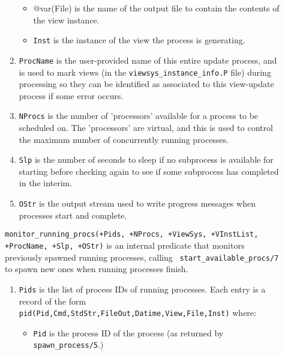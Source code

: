 \begin{description}
\begin{enumerate}
\begin{itemize}
\item @var(File) is the name of the output file to contain the
contents of the view instance.

\item {\tt Inst} is the instance of the view the process is generating.

\end{itemize}

\item {\tt ProcName} is the user-provided name of this entire update
process, and is used to mark views (in the
{\tt viewsys\_instance\_info.P} file) during processing so they can be
identified as associated to this view-update process if some error
occurs.

\item {\tt NProcs} is the number of 'processors' available for a
process to be scheduled on.  The 'processors' are virtual, and this is
used to control the maximum number of concurrently running processes.

\item {\tt Slp} is the number of seconds to sleep if no subprocess is
available for starting before checking again to see if some subprocess
has completed in the interim.

\item {\tt OStr} is the output stream used to write progress messages
when processes start and complete.

\end{enumerate}

%
{\tt monitor\_running\_procs(+Pids, +NProcs, +ViewSys, +VInstList,
  +ProcName, +Slp, +OStr)} is an internal predicate that monitors
previously spawned running processes, calling {\tt
  start\_available\_procs/7} to spawn new ones when running processes
finish.

\begin{enumerate}

\item {\tt Pids} is the list of process IDs of running processes.
Each entry is a record of the form
{\tt pid(Pid,Cmd,StdStr,FileOut,Datime,View,File,Inst)} where:

\begin{itemize}

\item {\tt Pid} is the process ID of the process (as returned by
{\tt spawn\_process/5}.)


\end{itemize}
\end{enumerate}
\end{description}
